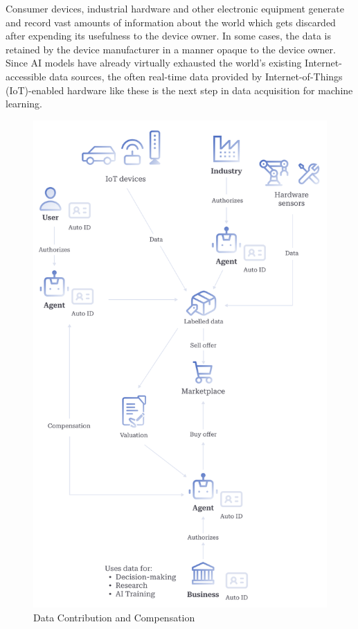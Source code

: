 \documentclass[conference]{IEEEtran}
\begin{document}
Consumer devices, industrial hardware and other electronic equipment generate and record vast amounts of information about the world which gets discarded after expending its usefulness to the device owner. In some cases, the data is retained by the device manufacturer in a manner opaque to the device owner. Since AI models have already virtually exhausted the world's existing Internet-accessible data sources, the often real-time data provided by Internet-of-Things (IoT)-enabled hardware like these is the next step in data acquisition for machine learning.
\begin{figure}
    \centering
    \includegraphics[width=1\linewidth]{data_comp.png}
\caption{Data Contribution and Compensation}
\label{fig:datacomp}
\end{figure}
\end{document}
